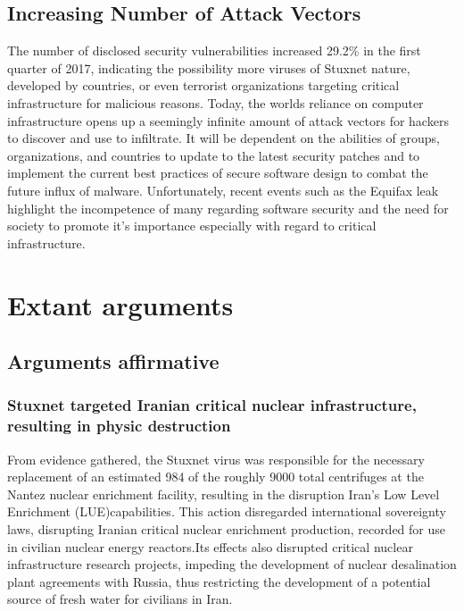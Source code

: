 \documentclass[12pt]{article}
\begin{document}
\begin{multicols}{2}
\subsection{Increasing Number of Attack Vectors}

The number of disclosed security vulnerabilities increased 29.2\% in the first quarter of 2017, indicating the possibility more viruses of Stuxnet nature, developed by countries, or even terrorist organizations targeting critical infrastructure for malicious reasons.\cite{industrialCyberVulnerabilities} Today, the worlds reliance on computer infrastructure opens up a seemingly infinite amount of attack vectors for hackers to discover and use to infiltrate. It will be dependent on the abilities of groups, organizations, and countries to update to the latest security patches and to implement the current best practices of secure software design to combat the future influx of malware. Unfortunately, recent events such as the Equifax leak highlight the incompetence of many regarding software security and the need for society to promote it's importance especially with regard to critical infrastructure.\cite{equifaxHack}


\section{Extant arguments}

\subsection{Arguments affirmative}

\subsubsection{Stuxnet targeted Iranian critical nuclear infrastructure, resulting in physic destruction}

From evidence gathered, the Stuxnet virus was responsible for the necessary replacement of an estimated 984 of the roughly 9000 total centrifuges at the Nantez nuclear enrichment facility, resulting in the disruption Iran's Low Level Enrichment (LUE)\footnotemark[1] capabilities.\cite{lookIntoIranianNuclearProgram} This action disregarded international sovereignty laws, disrupting Iranian critical nuclear enrichment production, recorded for use in civilian nuclear energy reactors.\cite{internationalSovereigntyDefinition}\footnotemark[2] Its effects also disrupted critical nuclear infrastructure research projects, impeding the development of nuclear desalination plant agreements with Russia, thus restricting the development of a potential source of fresh water for civilians in Iran.\cite{iranRussiaNuclearCooperation}


\end{multicols}
\end{document}
